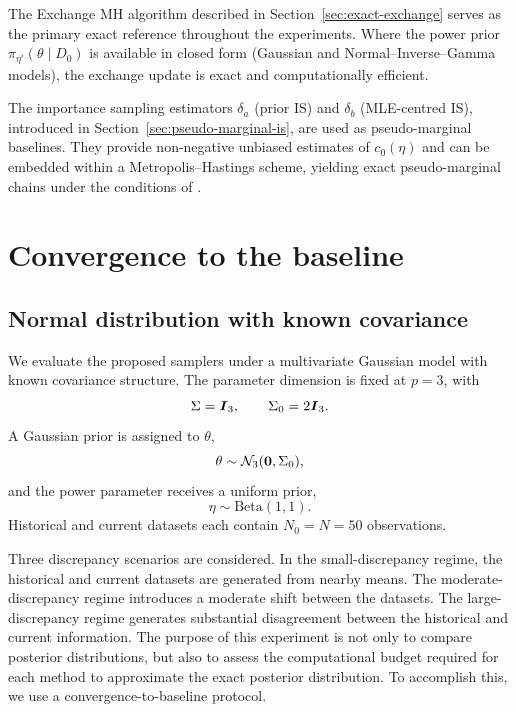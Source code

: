 The Exchange MH algorithm described in Section~\ref{sec:exact-exchange} serves as the primary exact reference throughout the experiments.
Where the power prior $\pi_{\eta'}(\theta \mid D_0)$ is available in closed form (Gaussian and Normal--Inverse--Gamma models), the exchange update is exact and computationally efficient.

The importance sampling estimators $\delta_a$ (prior IS) and $\delta_b$ (MLE-centred IS), introduced in Section~\ref{sec:pseudo-marginal-is}, are used as pseudo-marginal baselines.
They provide non-negative unbiased estimates of $c_0(\eta)$ and can be embedded within a Metropolis--Hastings scheme, yielding exact pseudo-marginal chains under the conditions of .


\section{Convergence to the baseline}


\subsection{Normal distribution with known covariance}
\label{subsec:gaussian-convergence}

We evaluate the proposed samplers under a multivariate Gaussian model with known covariance structure.
The parameter dimension is fixed at $p = 3$, with
\begin{equation}
\Sigma = \boldsymbol{I}_3,
\qquad
\Sigma_0 = 2\boldsymbol{I}_3.
\end{equation}
A Gaussian prior is assigned to $\theta$,
\begin{equation}
\theta \sim \mathcal{N}_3(\boldsymbol{0},\Sigma_0),
\end{equation}
and the power parameter receives a uniform prior,
\begin{equation}
\eta \sim \mathrm{Beta}(1,1).
\end{equation}
Historical and current datasets each contain $N_0 = N = 50$ observations.

Three discrepancy scenarios are considered.
In the small-discrepancy regime, the historical and current datasets are generated from nearby means.
The moderate-discrepancy regime introduces a moderate shift between the datasets.
The large-discrepancy regime generates substantial disagreement between the historical and current information.
The purpose of this experiment is not only to compare posterior distributions, but also to assess the computational budget required for each method to approximate the exact posterior distribution.
To accomplish this, we use a convergence-to-baseline protocol.

